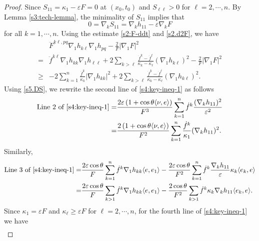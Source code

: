 \documentclass[11pt,reqno]{amsart}
\theoremstyle{definition}
\theoremstyle{remark}
\numberwithin{equation}{section}
\renewcommand{\(}{\left(}
\renewcommand{\)}{\right)}
\renewcommand{\-}{\overline}
\newcommand{\e}{\varepsilon}
\renewcommand{\k}{\kappa}
\renewcommand{\t}{\theta}
\begin{document}
\begin{proof}
Since $S_{11}=\k_1-\e F=0$ at $(x_0,t_0)$ and $S_{\ell\ell}>0$ for $\ell=2,\cdots,n$. By Lemma \ref{s3:tech-lemma}, the minimality of $S_{11}$ implies that
\begin{equation}\label{s5.DS}
0=\nabla_k S_{11}=\nabla_kh_{11}-\varepsilon\nabla_kF
\end{equation}
 for all $k=1,\cdots,n$.   Using the estimate \eqref{s2:F-ddt} and \eqref{s2.d2F}, we have
    \begin{align}\label{s5.Q1-0}
    &\ddot{F}^{k\ell,pq}\nabla_1 h_{k\ell}\nabla_1 h_{pq}-\frac{2}{F}|\nabla_1 F|^2  \nonumber\\
   =&\ddot{f}^{k\ell}\nabla_1h_{kk}\nabla_1h_{\ell\ell}+2\sum_{k>\ell}\frac{\dot{f}^k-\dot{f}^\ell}{\kappa_k-\kappa_\ell}(\nabla_1h_{k\ell})^2-\frac{2}{F}|\nabla_1 F|^2\nonumber\\
   \geq & -2 \sum_{k=1}^n\frac{\dot{f}^k}{\k_k}|\nabla_1 h_{kk}|^2+2\sum_{k>\ell}\frac{\dot{f}^k-\dot{f}^\ell}{\kappa_k-\kappa_\ell}(\nabla_1h_{k\ell})^2.
    \end{align}
Using \eqref{s5.DS}, we rewrite the second line of \eqref{s4:key-ineq-1} as follows
    \begin{align}
    \text{Line 2 of } \eqref{s4:key-ineq-1} =& \frac{2\varepsilon\left(1+\cos\theta\langle\nu,e\rangle\right)}{F^3}\sum_{k=1}^{n}\dot{f}^k\frac{(\nabla_kh_{11})^2}{\varepsilon^2}\nonumber\\
      =&  \frac{2\left(1+\cos\theta\langle\nu,e\rangle\right)}{F^2}\sum_{k=1}^{n}\frac{\dot{f}^k}{\kappa_1}(\nabla_kh_{11})^2. \label{s5.Q1-1}
    \end{align}
  Similarly,
    \begin{align}
      \text{Line 3 of } \eqref{s4:key-ineq-1} = & \frac{2\varepsilon\cos\t}{F}\sum_{k=1}^{n}\dot{f}^k\nabla_1h_{kk} \langle e,e_1\rangle-\frac{2\varepsilon\cos\t}{F^2}\sum_{k=1}^{n}\dot{f}^{k}\frac{\nabla_kh_{11}}{\varepsilon} \kappa_k\langle e_k,e\rangle \nonumber\\
      = & \frac{2\varepsilon\cos\t}{F}\sum_{k>1}\dot{f}^k\nabla_1h_{kk} \langle e,e_1\rangle-\frac{2\cos\t}{F^2}\sum_{k>1}\dot{f}^{k}\kappa_k\nabla_kh_{11}\langle e_k,e\rangle. \label{s5.Q1-2}
    \end{align}
    Since $\kappa_1=\varepsilon F$ and $\kappa_\ell\geq \varepsilon F$ for $\ell=2,\cdots,n$,  for the fourth line of \eqref{s4:key-ineq-1} we have
    \begin{align}\label{s5.Q1-3}

\end{align}
\end{proof}
\end{document}
